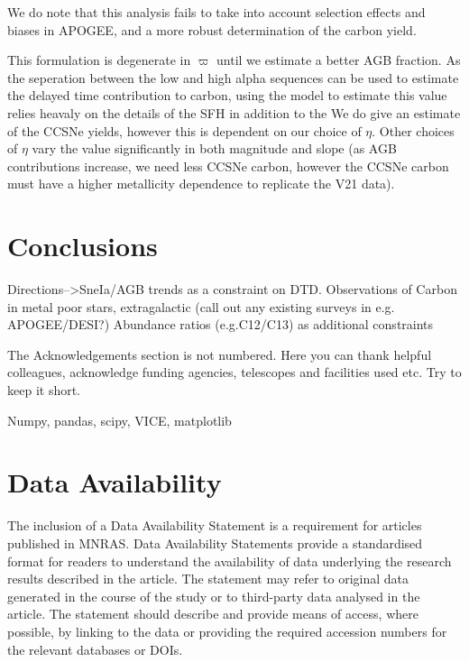 \documentclass[12pt,oneside]{report}
\begin{document}
We do note that this analysis fails to take into account selection effects and biases in APOGEE, and a more robust determination of the carbon yield. 


This formulation is degenerate in $\varpi$ until we estimate a better AGB fraction. As the seperation between the low and high alpha sequences can be used to estimate the delayed time contribution to carbon, using the model to estimate this value relies heavaly on the details of the SFH in addition to the 
We do give an estimate of the CCSNe yields, however this is dependent on our choice of $\eta$. Other choices of $\eta$ vary the value significantly in both magnitude and slope (as AGB contributions increase, we need less CCSNe carbon, however the CCSNe carbon must have a higher metallicity dependence to replicate the V21 data). 



\chapter{Conclusions}

Directions-->SneIa/AGB trends as a constraint on DTD.
Observations of Carbon in metal poor stars, extragalactic (call out any
existing surveys in e.g. APOGEE/DESI?)
Abundance ratios (e.g.C12/C13) as additional constraints


The Acknowledgements section is not numbered. Here you can thank helpful
colleagues, acknowledge funding agencies, telescopes and facilities used etc.
Try to keep it short.

Numpy, pandas, scipy, VICE, matplotlib
\cite{numpy, matplotlib}

\cite{OhioSupercomputerCenter1987}

\chapter*{Data Availability}

 
The inclusion of a Data Availability Statement is a requirement for articles published in MNRAS. Data Availability Statements provide a standardised format for readers to understand the availability of data underlying the research results described in the article. The statement may refer to original data generated in the course of the study or to third-party data analysed in the article. The statement should describe and provide means of access, where possible, by linking to the data or providing the required accession numbers for the relevant databases or DOIs.
\end{document}
